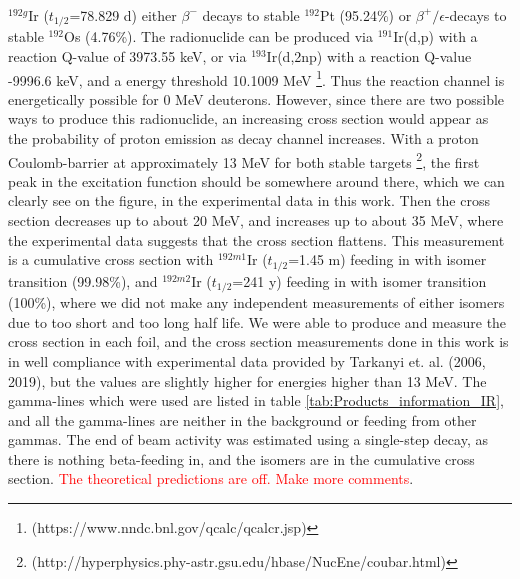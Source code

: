 \subsubsection{}
$^{192g}$Ir ($t_{1/2}$=78.829 d) either $\beta^-$ decays to stable $^{192}$Pt (95.24\%) or $\beta^+/\epsilon$-decays to stable $^{192}$Os (4.76\%). The radionuclide can be produced via $^{191}$Ir(d,p) with a reaction Q-value of 3973.55 keV, or via $^{193}$Ir(d,2np) with a reaction Q-value -9996.6 keV, and a energy threshold 10.1009 MeV \footnote{(https://www.nndc.bnl.gov/qcalc/qcalcr.jsp)}. Thus the reaction channel is energetically possible for 0 MeV deuterons. However, since there are two possible ways to produce this radionuclide, an increasing cross section would appear as the probability of proton emission as decay channel increases. With a proton Coulomb-barrier at approximately 13 MeV for both stable targets \footnote{(http://hyperphysics.phy-astr.gsu.edu/hbase/NucEne/coubar.html)}, the first peak in the excitation function should be somewhere around there, which we can clearly see on the figure, in the experimental data in this work. Then the cross section decreases up to about 20 MeV, and increases up to about 35 MeV, where the experimental data suggests that the cross section flattens. This measurement is a cumulative cross section with $^{192m1}$Ir ($t_{1/2}$=1.45 m) feeding in with isomer transition (99.98\%), and $^{192m2}$Ir ($t_{1/2}$=241 y) feeding in with isomer transition (100\%), where we did not make any independent measurements of either isomers due to too short and too long half life. We were able to produce and measure the cross section in each foil, and the cross section measurements done in this work is in well compliance with experimental data provided by Tarkanyi et. al. (2006, 2019), but the values are slightly higher for energies higher than 13 MeV. The gamma-lines which were used are listed in table \ref{tab:Products_information_IR}, and all the gamma-lines are neither in the background or feeding from other gammas. The end of beam activity was estimated using a single-step decay, as there is nothing beta-feeding in, and the isomers are in the cumulative cross section. \textcolor{red}{The theoretical predictions are off. Make more comments}. 

